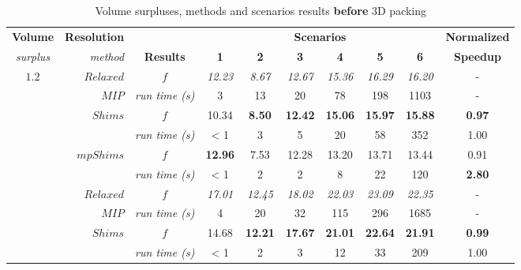 \documentclass[preprint,authoryear]{elsarticle}
\begin{document}
\begin{table}[H]
	\centering
	\caption{Volume surpluses, methods and scenarios results {\bf before} 3D packing}  \label{tab:results}
	\footnotesize
	\begin{tabular}{crcccccccc}
		\toprule
		{\bf Volume}     &{\bf Resolution}&                              &\multicolumn{6}{c}{\bf Scenarios}                                                   &{\bf Normalized}\\
		\cmidrule{4-9}		
		{\it surplus}    &{\it method}    & {\bf Results}      &{\bf 1}    &{\bf 2}    &{\bf 3}    &{\bf 4}    &{\bf 5}    &{\bf 6}    &{\bf Speedup} \\
		\toprule	
		\multirow{7}{*}{$1.2$}&$Relaxed$  & $f$                &{\it 12.23}&{\it 8.67} &{\it 12.67}&{\it 15.36}&{\it 16.29}&{\it 16.20}& - \\%
		&                      $MIP$      & {\it run time (s)} &     3     &     13    &     20    &     78    &      198  &     1103  & - \\%
		\cmidrule{2-10}		                       
		&\multirow{2}{*}{ $Shims$}        & $f$                &     10.34 &{\bf 8.50} &{\bf 12.42}&{\bf 15.06}&{\bf 15.97}&{\bf 15.88}&{\bf 0.97} \\%
		&                                 & {\it run time (s)} &     < 1   &     3     &     5     &     20    &     58    &     352   &  1.00 \\%
		\cmidrule{2-10}		                       
		&\multirow{2}{*}{ $mpShims$}      & $f$                &{\bf 12.96}&   7.53    &  12.28    &   13.20   &  13.71    &   13.44   &  0.91\\%
		&                                 & {\it run time (s)} &     < 1   &     2     &     2     &     8     &     22    &     120   &  {\bf 2.80}\\%
		\toprule		
		\multirow{7}{*}{$1.5$}&$Relaxed$  & $f$                &{\it 17.01}&{\it 12.45}&{\it 18.02}&{\it 22.03}&{\it 23.09}&{\it 22.35}& - \\%
		&                       $MIP$     & {\it run time (s)} &     4     &     20    &     32    &     115   &     296   &     1685  &  -\\%
        \cmidrule{2-10}		                       
        &\multirow{2}{*}{ $Shims$}        & $f$                &     14.68 &{\bf 12.21}&{\bf 17.67}&{\bf 21.01}&{\bf 22.64}&{\bf 21.91}&{\bf 0.99}  \\%
        &                                 & {\it run time (s)} &     < 1   &     2     &     3     &     12    &     33    &   209     &  1.00 \\%

\end{tabular}
\end{table}
\end{document}
